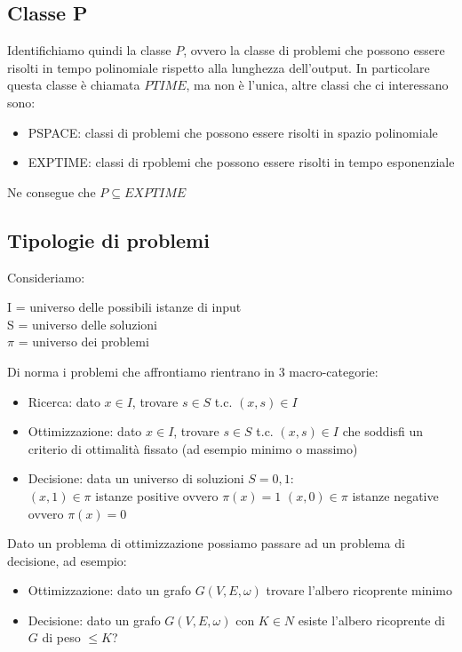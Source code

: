 \documentclass[11pt, oneside]{article}   	%
\begin{document}
\subsection*{Classe P}
Identifichiamo quindi la classe $P$, ovvero la classe di problemi che possono essere risolti in tempo polinomiale rispetto alla lunghezza dell'output. In particolare questa classe è chiamata $PTIME$, ma non è l'unica, altre classi che ci interessano sono:
\begin{itemize}
\item PSPACE: classi di problemi che possono essere risolti in spazio polinomiale
\item EXPTIME: classi di rpoblemi che possono essere risolti in tempo esponenziale
\end{itemize}
Ne consegue che $P \subseteq EXPTIME$
\subsection*{Tipologie di problemi}
Consideriamo:
\begin{center}
I = universo delle possibili istanze di input\\
S = universo delle soluzioni\\
$\pi$ = universo dei problemi\\
\end{center}
Di norma i problemi che affrontiamo rientrano in 3 macro-categorie:
\begin{itemize}
\item Ricerca: dato $x\in I$, trovare $s \in S$ t.c. $(x,s)\in I$
\item Ottimizzazione: dato  $x\in I$, trovare $s \in S$ t.c. $(x,s)\in I$ che soddisfi un criterio di ottimalità fissato (ad esempio minimo o massimo)
\item Decisione: data un universo di soluzioni $S = {0,1}$:\\
$(x,1) \in \pi$ istanze positive ovvero $\pi(x) = 1$
$(x,0) \in \pi$ istanze negative ovvero $\pi(x) = 0$
\end{itemize}
Dato un problema di ottimizzazione possiamo passare ad un problema di decisione, ad esempio:
\begin{itemize}
\item Ottimizzazione: dato un grafo $G(V,E,\omega)$  trovare l’albero ricoprente minimo
\item Decisione: dato un grafo $G(V,E,\omega)$ con $K\in N$ esiste l’albero ricoprente di $G$ di peso $\leq K$?
\end{itemize}
\end{document}
